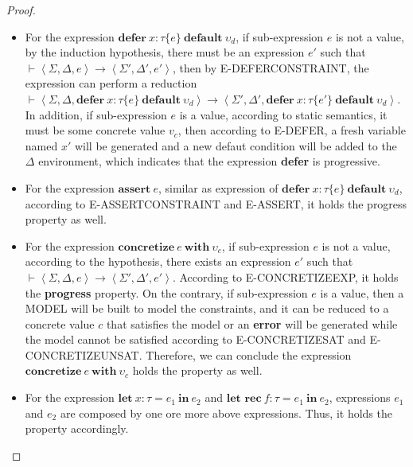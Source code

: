 \begin{proof}
\begin{itemize}
            \item For the expression $\textbf{defer}~x:\tau\{e\}~\textbf{default}~\upsilon_d$, if sub-expression $e$ is not a value, by the induction hypothesis, there must be an expression $e' $ such that $\vdash\left\langle\Sigma, \Delta, e\right\rangle\rightarrow\left\langle\Sigma',\Delta',e'\right\rangle$, then by E-DEFERCONSTRAINT, the expression can perform a reduction $\vdash\left\langle\Sigma, \Delta, \textbf{defer}~x: \tau\{e\}~\textbf{default}~\upsilon_d \right\rangle\rightarrow\left\langle\Sigma',\Delta',\textbf{defer}~x:\tau\{e'\}~\textbf{default}~\upsilon_d\right\rangle$. In addition, if sub-expression $e$ is a value, according to static semantics, it must be some concrete value $v_c$, then according to E-DEFER, a fresh variable named $x'$ will be generated and a new defaut condition will be added to the $\Delta$ environment, which indicates that the expression \textbf{defer}  is progressive.
            \item For the expression $\textbf{assert}~e$, similar as expression of $\textbf{defer}~x:\tau\{e\}~\textbf{default}~\upsilon_d$, according to E-ASSERTCONSTRAINT and E-ASSERT, it holds the progress property as well.
            \item For the expression $\textbf{concretize}~e~\textbf{with}~\upsilon_c$, if sub-expression $e$ is not a value, according to the hypothesis, there exists an expression $e'$ such that  $\vdash\left\langle\Sigma, \Delta, e\right\rangle\rightarrow\left\langle\Sigma',\Delta',e'\right\rangle$. According to E-CONCRETIZEEXP, it holds the \textbf{progress} property. On the contrary, if sub-expression $e$ is a value, then a MODEL will be built to model the constraints, and it can be reduced to a concrete value $c$ that satisfies the model or an \textbf{error} will be generated while the model cannot be satisfied according to E-CONCRETIZESAT and E-CONCRETIZEUNSAT. Therefore, we can conclude the expression $\textbf{concretize}~e~\textbf{with}~\upsilon_c$ holds the property as well.
            \item For the expression $\textbf{let}~x:\tau=e_1~\textbf{in}~e_2$ and $\textbf{let rec}~f:\tau=e_1~\textbf{in}~e_2$, expressions $e_1$ and $e_2$ are composed by one ore more above expressions. Thus, it holds the property accordingly.
        \end{itemize}
    \end{proof}
    
